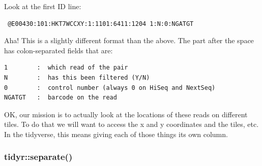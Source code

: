 \documentclass[]{krantz}
\makeatletter
\newenvironment{Shaded}{\begin{snugshade}}{\end{snugshade}}
\newcommand{\CommentTok}[1]{\textcolor[rgb]{0.37,0.37,0.37}{\textit{#1}}}
\newcommand{\DataTypeTok}[1]{\textcolor[rgb]{0.27,0.27,0.27}{#1}}
\newcommand{\DecValTok}[1]{\textcolor[rgb]{0.06,0.06,0.06}{#1}}
\newcommand{\KeywordTok}[1]{\textcolor[rgb]{0.27,0.27,0.27}{\textbf{#1}}}
\newcommand{\NormalTok}[1]{#1}
\newcommand{\OperatorTok}[1]{\textcolor[rgb]{0.43,0.43,0.43}{\textbf{#1}}}
\newcommand{\OtherTok}[1]{\textcolor[rgb]{0.37,0.37,0.37}{#1}}
\newcommand{\StringTok}[1]{\textcolor[rgb]{0.5,0.5,0.5}{#1}}
\newenvironment{kframe}{%
\medskip{}
\setlength{\fboxsep}{.8em}
 \def\at@end@of@kframe{}%
 \ifinner\ifhmode%
  \def\at@end@of@kframe{\end{minipage}}%
  \begin{minipage}{\columnwidth}%
 \fi\fi%
 \def\FrameCommand##1{\hskip\@totalleftmargin \hskip-\fboxsep
 \colorbox{shadecolor}{##1}\hskip-\fboxsep
     \hskip-\linewidth \hskip-\@totalleftmargin \hskip\columnwidth}%
 \MakeFramed {\advance\hsize-\width
   \@totalleftmargin\z@ \linewidth\hsize
   \@setminipage}}%
 {\par\unskip\endMakeFramed%
 \at@end@of@kframe}
\renewenvironment{Shaded}{\begin{kframe}}{\end{kframe}}
\makeatother
\begin{document}
\begin{Shaded}
\end{Shaded}

Look at the first ID line:

\begin{verbatim}
 @E00430:101:HKT7WCCXY:1:1101:6411:1204 1:N:0:NGATGT
\end{verbatim}

Aha! This is a slightly different format than the above. The part after the
space has colon-separated fields that are:

\begin{verbatim}
1        :  which read of the pair
N        :  has this been filtered (Y/N)
0        :  control number (always 0 on HiSeq and NextSeq)
NGATGT   :  barcode on the read
\end{verbatim}

OK, our mission is to actually look at the locations of these reads on different
tiles. To do that we will want to access the x and y coordinates and the
tiles, etc. In the tidyverse, this means giving each of those things its own
column.

\hypertarget{tidyrseparate}{%
\subsubsection{tidyr::separate()}\label{tidyrseparate}}
\end{document}
